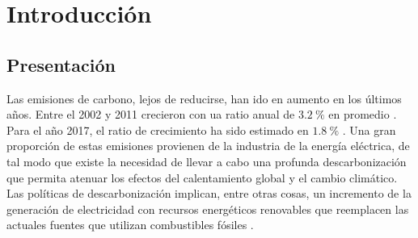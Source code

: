 

\chapter{Introducción}


\section{Presentación} %

Las emisiones de carbono, lejos de reducirse, han ido en aumento en los últimos años. Entre el 2002 y 2011  crecieron con ua ratio anual de $3.2\ \%$ en promedio \citep[p.~50]{stocker_climate_2013}. Para el año 2017, el ratio de crecimiento ha sido estimado en $1.8\ \%$ \citep[p.~2]{peters_towards_2017}. Una gran proporción de estas emisiones provienen de la industria de la energía eléctrica, de tal modo que existe la necesidad de llevar a cabo una profunda descarbonización que permita atenuar los efectos del calentamiento global y el cambio climático. Las políticas de descarbonización  implican, entre otras cosas, un incremento de la generación de electricidad con recursos energéticos renovables que reemplacen  las actuales fuentes que utilizan combustibles fósiles \citep[p.~3]{duan_modeling_2020}.

